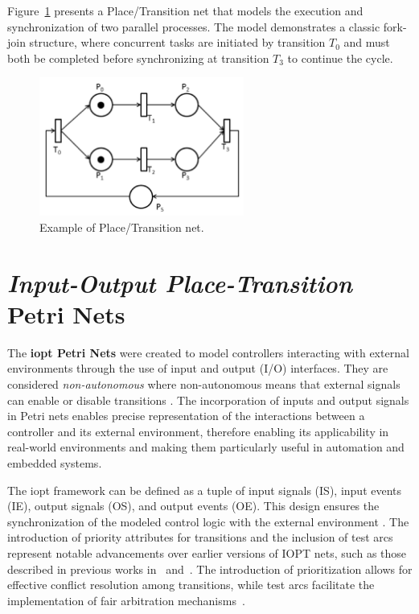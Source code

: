 Figure~\ref{fig:petrinet} presents a Place/Transition net that models the execution and synchronization of two parallel processes. The model demonstrates a classic fork-join structure, where concurrent tasks are initiated by transition $T_0$ and must both be completed before synchronizing at transition $T_3$ to continue the cycle.


\begin{figure}[htbp]
  \centering
  \includegraphics[width=0.6\textwidth]{Chapters/Figures/petriNetExemplo.jpg}
  \caption{Example of Place/Transition net.}
  \label{fig:petrinet}
\end{figure}

\section{\emph{Input-Output Place-Transition} Petri Nets}
\label{sec:iopt_petri_nets}


The \textbf{\gls{iopt} Petri Nets} were created to model controllers interacting with external environments through the use of input and output (I/O) interfaces\cite{iopttools}. They are considered \emph{non-autonomous}  where non-autonomous means that external signals can enable or disable transitions \cite{2015gomes}. The incorporation of inputs and output signals in Petri nets enables precise representation of the interactions between a controller and its external environment, therefore enabling its applicability in real-world environments  and making them particularly useful in automation and embedded systems\cite{iopttools}.


The \gls{iopt} framework can be defined as a tuple of input signals (IS), input events (IE), output signals (OS), and output events (OE). This design ensures the synchronization of the modeled control logic with the external environment \cite{iopttools}. The introduction of priority attributes for transitions and the inclusion of test arcs represent notable advancements over earlier versions of IOPT nets, such as those described in previous works in~\cite{barros2004} and~\cite{bg2005}. The introduction of prioritization allows for effective conflict resolution among transitions, while test arcs facilitate the implementation of fair arbitration mechanisms~\cite{conflict}.


